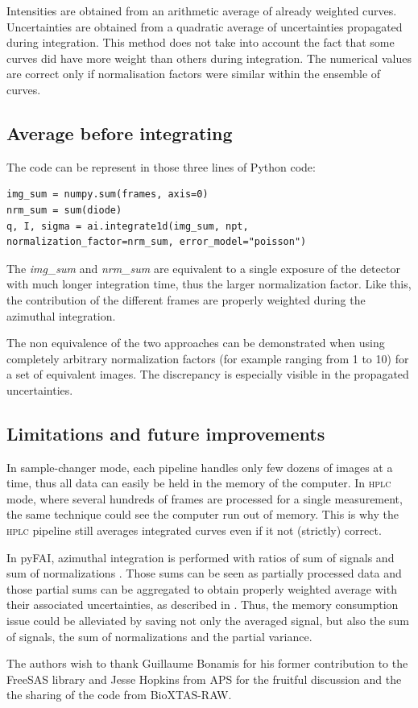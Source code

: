 \documentclass[preprint]{iucr}              %
\begin{document}
Intensities are obtained from an arithmetic average of already weighted curves.
Uncertainties are obtained from a quadratic average of uncertainties propagated during integration. 
This method does not take into account the fact that some curves did have more weight than others during integration.
The numerical values are correct only if normalisation factors were similar within the ensemble of curves.

\subsection{Average before integrating}
The code can be represent in those three lines of Python code:
\begin{verbatim} 
img_sum = numpy.sum(frames, axis=0)
nrm_sum = sum(diode)
q, I, sigma = ai.integrate1d(img_sum, npt, normalization_factor=nrm_sum, error_model="poisson")
\end{verbatim}

The \textit{img\_sum} and \textit{nrm\_sum} are equivalent to a single exposure of the detector with much longer integration time, thus the larger normalization factor. 
Like this, the contribution of the different frames are properly weighted during the azimuthal integration. 

The non equivalence of the two approaches can be demonstrated when using completely arbitrary normalization factors (for example ranging from 1 to 10) for a set of equivalent images.
The discrepancy is especially visible in the propagated uncertainties.  

\subsection{Limitations and future improvements}
In sample-changer mode, each pipeline handles only few dozens of images at a time, thus all data can easily be held in the memory of the computer.
In \textsc{hplc} mode, where several hundreds of frames are processed for a single measurement, the same technique could see the computer run out of memory.
This is why the \textsc{hplc} pipeline still averages integrated curves even if it not (strictly) correct. 

In pyFAI, azimuthal integration is performed with ratios of sum of signals and sum of normalizations \cite{pyfai_2020}.
Those sums can be seen as partially processed data and those partial sums can be aggregated to obtain properly weighted average with their associated uncertainties, as described in .
Thus, the memory consumption issue could be alleviated by saving not only the averaged signal, but also the sum of signals, the sum of normalizations and the partial variance.      

The authors wish to thank Guillaume Bonamis for his former contribution to the FreeSAS library and Jesse Hopkins from APS for the fruitful discussion and the the sharing of the code from BioXTAS-RAW.




\end{document}
